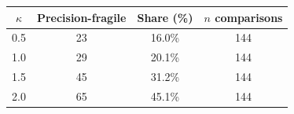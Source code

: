 \begin{tabular}{cccc}
\toprule
$\kappa$ & Precision-fragile & Share (\%) & $n$ comparisons \\
\midrule
  0.5 & 23 & 16.0\% & 144 \\
  1.0 & 29 & 20.1\% & 144 \\
  1.5 & 45 & 31.2\% & 144 \\
  2.0 & 65 & 45.1\% & 144 \\
\bottomrule
\end{tabular}